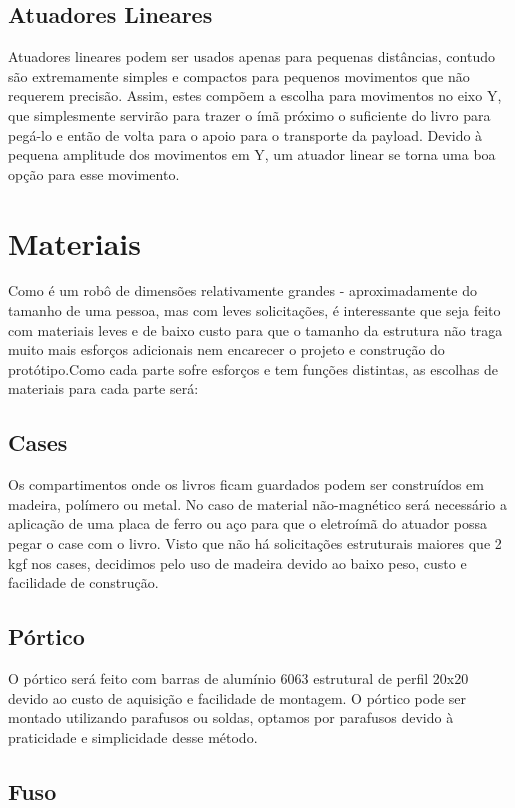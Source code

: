 \subsection{Atuadores Lineares}

Atuadores lineares podem ser usados apenas para pequenas distâncias, contudo são extremamente simples e compactos para pequenos movimentos que não requerem precisão. Assim, estes compõem a escolha para movimentos no eixo Y, que simplesmente servirão para trazer o ímã próximo o suficiente do livro para pegá-lo e então de volta para o apoio para o transporte da payload. Devido à pequena amplitude dos movimentos em Y, um atuador linear se torna uma boa opção para esse movimento.

\section{Materiais}

Como é um robô de dimensões relativamente grandes - aproximadamente do tamanho de uma pessoa, mas com leves solicitações, é interessante que seja feito com materiais leves e de baixo custo para que o tamanho da estrutura não traga muito mais esforços adicionais nem encarecer o projeto e construção do protótipo.Como cada parte sofre esforços e tem funções distintas, as escolhas de materiais para cada parte será:
\subsection{Cases}

Os compartimentos onde os livros ficam guardados podem ser construídos em madeira, polímero ou metal. No caso de material não-magnético será necessário a aplicação de uma placa de ferro ou aço para que o eletroímã do atuador possa pegar o case com o livro. Visto que não há solicitações estruturais maiores que 2 kgf nos cases, decidimos pelo uso de madeira devido ao baixo peso, custo e facilidade de construção.

\subsection{Pórtico}

O pórtico será feito com barras de alumínio 6063 estrutural de perfil 20x20 devido ao custo de aquisição e facilidade de montagem. O pórtico pode ser montado utilizando parafusos ou soldas, optamos por parafusos devido à praticidade e simplicidade desse método.

\subsection{Fuso}

